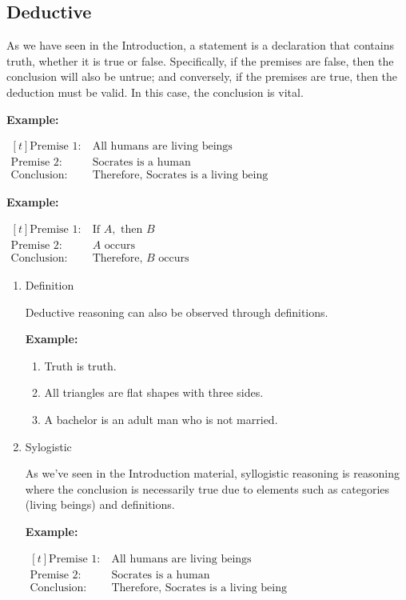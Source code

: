 \documentclass[12pt,a4paper,openany]{article}
\begin{document}
\subsection{Deductive}\label{deductive}

As we have seen in the Introduction, a statement is a
declaration that contains truth, whether it is true or false.
Specifically, if the premises are false, then the conclusion will also
be untrue; and conversely, if the premises are true, then the
deduction must be valid. In this case, the conclusion is vital.

\textbf{Example:}

\noindent
\(
\begin{aligned}[t]
 \text{Premise 1:} \ & \text{All humans are living beings} \\
 \text{Premise 2:} \ & \text{Socrates is a human} \\
 \text{Conclusion:} \ & \text{Therefore, Socrates is a living being}
\end{aligned}
\)

\textbf{Example:}

\noindent
\(
\begin{aligned}[t]
 \text{Premise 1:} \ & \text{If } A, \text{ then } B \\
 \text{Premise 2:} \ & A \text{ occurs} \\
 \text{Conclusion:} \ & \text{Therefore, } B \text{ occurs}
\end{aligned}
\)
\begin{enumerate}

\item Definition

Deductive reasoning can also be observed through definitions.

\textbf{Example:}

\begin{enumerate}
\item Truth is truth.
\item All triangles are flat shapes with three sides.
\item A bachelor is an adult man who is not married.
\end{enumerate}

\item Sylogistic

As we've seen in the Introduction material, syllogistic reasoning is
reasoning where the conclusion is necessarily true due to elements
such as categories (living beings) and definitions.

\textbf{Example:}

\noindent
\(
\begin{aligned}[t]
 \text{Premise 1:} \ & \text{All humans are living beings} \\
 \text{Premise 2:} \ & \text{Socrates is a human} \\
 \text{Conclusion:} \ & \text{Therefore, Socrates is a living being}
\end{aligned}
\)

\end{enumerate}
\end{document}
